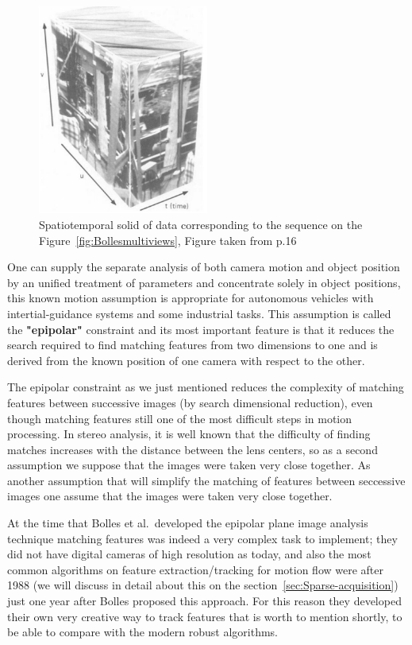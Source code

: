 \begin{figure}[h!]
\centering
\includegraphics[width= 0.50\textwidth]{./Diagrams/block1.jpg}
\caption{Spatiotemporal solid of data corresponding to the sequence on the Figure~\ref{fig:Bollesmultiviews}, Figure taken from \cite{Bolles} p.16}
\end{figure}


\bigskip

One can supply the separate analysis of both camera motion and object position by an unified treatment of parameters and concentrate solely in object positions, this known motion assumption is appropriate for autonomous vehicles with intertial-guidance systems and some industrial tasks. This assumption is called the \textbf{"epipolar"} constraint and its most important feature is that it reduces the search required to find matching features from two dimensions to one and is derived from the known position of one camera with respect to the other. 

\bigskip

The epipolar constraint as we just mentioned reduces the complexity of matching features between successive images (by search dimensional reduction), even though matching features still one of the most difficult steps in motion processing. In stereo analysis, it is well known that the difficulty of finding matches increases with the distance between the lens centers, so as a second assumption we suppose that the images were taken very close together. 
As another assumption that will simplify the matching of features between seccessive images one assume that the images were taken very close together. 

\bigskip 

At the time that Bolles et al.\ developed the epipolar plane image analysis technique matching features was indeed a very complex task to implement; they did not have digital cameras of high resolution as today, and also the most common algorithms on feature extraction/tracking for motion flow were after 1988 (we will discuss in detail about this on the section~\ref{sec:Sparse-acquisition}) just one year after Bolles proposed this approach. For this reason they developed their own very creative way to track features that is worth to mention shortly, to be able to compare with the modern robust algorithms.  

